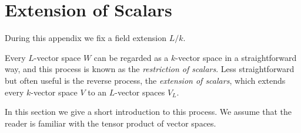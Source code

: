 \chapter{Extension of Scalars}
\label{appendix: extension of scalars}


\begin{conventions}
  During this appendix we fix a field extension $L/k$.
\end{conventions}


\begin{fluff}
  Every $L$-vector space $W$ can be regarded as a $k$-vector space in a straightforward way, and this process is known as the \emph{restriction of scalars}.
  Less straightforward but often useful is the reverse process, the \emph{extension of scalars}, which extends every $k$-vector space $V$ to an $L$-vector spaces $V_L$.
  
  In this section we give a short introduction to this process.
  We assume that the reader is familiar with the tensor product of vector spaces.
\end{fluff}









